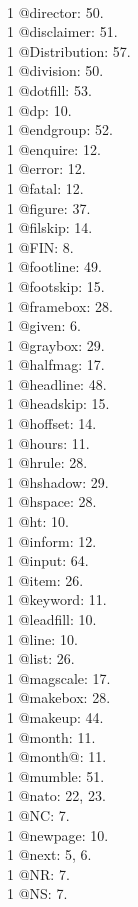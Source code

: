 \\1 @director: 50.
\\1 @disclaimer: 51.
\\1 @Distribution: 57.
\\1 @division: 50.
\\1 @dotfill: 53.
\\1 @dp: 10.
\\1 @endgroup: 52.
\\1 @enquire: 12.
\\1 @error: 12.
\\1 @fatal: 12.
\\1 @figure: 37.
\\1 @filskip: 14.
\\1 @FIN: 8.
\\1 @footline: 49.
\\1 @footskip: 15.
\\1 @framebox: 28.
\\1 @given: 6.
\\1 @graybox: 29.
\\1 @halfmag: 17.
\\1 @headline: 48.
\\1 @headskip: 15.
\\1 @hoffset: 14.
\\1 @hours: 11.
\\1 @hrule: 28.
\\1 @hshadow: 29.
\\1 @hspace: 28.
\\1 @ht: 10.
\\1 @inform: 12.
\\1 @input: 64.
\\1 @item: 26.
\\1 @keyword: 11.
\\1 @leadfill: 10.
\\1 @line: 10.
\\1 @list: 26.
\\1 @magscale: 17.
\\1 @makebox: 28.
\\1 @makeup: 44.
\\1 @month: 11.
\\1 @month@: 11.
\\1 @mumble: 51.
\\1 @nato: 22, 23.
\\1 @NC: 7.
\\1 @newpage: 10.
\\1 @next: 5, 6.
\\1 @NR: 7.
\\1 @NS: 7.
